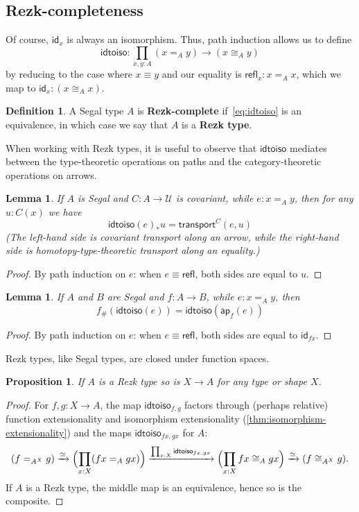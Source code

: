 \documentclass[12pt]{amsart}
\theoremstyle{plain}
\newtheorem{prop}[thm]{Proposition}
\newtheorem{lem}[thm]{Lemma}
\theoremstyle{definition}
\newtheorem{defn}[thm]{Definition}
\theoremstyle{remark}
\numberwithin{equation}{section}
\newcommand{\extfn}[1]{{#1}_\#}
\newcommand{\jdeq}{\equiv}
\newcommand{\univtype}{\mathcal{U}}
\newcommand{\refl}{\mathsf{refl}}
\newcommand{\idtoiso}{\mathsf{idtoiso}}
\newcommand{\idarr}[1]{\mathsf{id}_{#1}}
\newcommand{\transport}[3]{\mathsf{transport}^{#1}(#2,#3)}%
\newcommand{\ap}{\mathsf{ap}}                             %
\newcommand{\covtr}[1]{{#1}_*}  %
\newcommand{\Parens}[1]{\Bigl(#1\Bigr)}
\let\xto\xrightarrow
\begin{document}
\subsection{Rezk-completeness}
\label{sec:completeness}

Of course, $\idarr x$ is always an isomorphism.
Thus, path induction allows us to define
\begin{equation}
  \idtoiso:\prod_{x,y :A} (x =_A y) \to (x\cong_A y)\label{eq:idtoiso}
\end{equation}
by reducing to the case where $x \jdeq y$ and our equality is $\refl_x : x =_A x$, which we map to $\idarr x : (x\cong_A x)$.

\begin{defn}\label{defn:rezk-complete} A Segal type  $A$ is \textbf{Rezk-complete}  if~\eqref{eq:idtoiso} is an equivalence, in which case we say that $A$ is a \textbf{Rezk type}.
\end{defn}

When working with Rezk types, it is useful to observe that $\idtoiso$ mediates between the type-theoretic operations on paths and the category-theoretic operations on arrows.

\begin{lem}\label{thm:idtoiso-trans}
  If $A$ is Segal and $C:A\to\univtype$ is covariant, while $e:x=_A y$, then for any $u:C(x)$ we have
  \[ \covtr{\idtoiso(e)}{u}= \transport{C}{e}{u} \]
  (The left-hand side is covariant transport along an arrow, while the right-hand side is homotopy-type-theoretic transport along an equality.)
\end{lem}
\begin{proof}
  By path induction on $e$: when $e\jdeq \refl$, both sides are equal to $u$.
\end{proof}

\begin{lem}\label{thm:idtoiso-ap}
  If $A$ and $B$ are Segal and $f:A\to B$, while $e:x=_A y$, then
  \[ \extfn f(\idtoiso(e)) = \idtoiso(\ap_f(e)) \]
\end{lem}
\begin{proof}
  By path induction on $e$: when $e\jdeq \refl$, both sides are equal to $\idarr{fx}$.
\end{proof}

Rezk types, like Segal types, are closed under function spaces.

\begin{prop} If $A$ is a Rezk type so is $X \to A$ for any type or shape $X$.
\end{prop}
\begin{proof}
For $f,g:X\to A$, the map $\idtoiso_{f,g}$ factors through (perhaps relative) function extensionality and isomorphism extensionality (\cref{thm:isomorphism-extensionality}) and the maps $\idtoiso_{fx,gx}$ for $A$:
\[ 
(f =_{A^X} g) \xto{\simeq} \Parens{\prod_{x :X} (fx =_A gx)} \xto{\prod_{x:X} \idtoiso_{fx,gx}} \Parens{\prod_{x :X} fx \cong_A gx} \xto{\simeq} (f \cong_{A^X} g).\]
If $A$ is a Rezk type, the middle map is an equivalence, hence so is the composite.
\end{proof}
\end{document}
